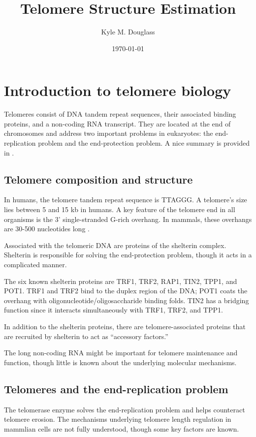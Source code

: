\documentclass[11pt]{article}
\author{Kyle M. Douglass}
\date{\today}
\title{Telomere Structure Estimation}
\begin{document}
\maketitle
\tableofcontents


\section{Introduction to telomere biology}
\label{sec-1}
Telomeres consist of DNA tandem repeat sequences, their associated
binding proteins, and a non-coding RNA transcript. They are located at
the end of chromosomes and address two important problems in
eukaryotes: the end-replication problem and the end-protection
problem. A nice summary is provided in \cite{sfeir-jcellsci-2012}.

\subsection{Telomere composition and structure}
\label{sec-1-1}
In humans, the telomere tandem repeat sequence is TTAGGG. A telomere's
size lies between 5 and 15 kb in humans. A key feature of the telomere
end in all organisms is the 3' single-stranded G-rich overhang. In
mammals, these overhangs are 30-500 nucleotides long
\cite{sfeir-jcellsci-2012}.

Associated with the telomeric DNA are proteins of the shelterin
complex. Shelterin is responsible for solving the end-protection problem,
though it acts in a complicated manner.

The six known shelterin proteins are TRF1, TRF2, RAP1, TIN2, TPP1, and
POT1. TRF1 and TRF2 bind to the duplex region of the DNA; POT1 coats
the overhang with oligonucleotide/oligosaccharide binding folds. TIN2
has a bridging function since it interacts simultaneously with TRF1,
TRF2, and TPP1.

In addition to the shelterin proteins, there are telomere-associated
proteins that are recruited by shelterin to act as ``accessory
factors.''

The long non-coding RNA might be important for telomere maintenance
and function, though little is known about the underlying molecular
mechanisms.

\subsection{Telomeres and the end-replication problem}
\label{sec-1-2}
The telomerase enzyme solves the end-replication problem and helps
counteract telomere erosion. The mechanisms underlying telomere length
regulation in mammlian cells are not fully understood, though some key
factors are known.
\end{document}

